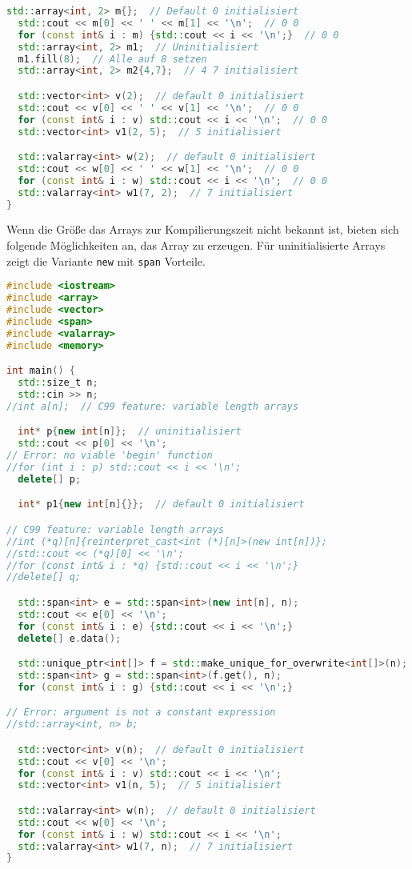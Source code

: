 \documentclass[10pt,twocolumn]{scrartcl}
\begin{document}
\begin{lstlisting}[language=C++]
  std::array<int, 2> m{};  // Default 0 initialisiert
  std::cout << m[0] << ' ' << m[1] << '\n';  // 0 0
  for (const int& i : m) {std::cout << i << '\n';}  // 0 0
  std::array<int, 2> m1;  // Uninitialisiert
  m1.fill(8);  // Alle auf 8 setzen
  std::array<int, 2> m2{4,7};  // 4 7 initialisiert

  std::vector<int> v(2);  // default 0 initialisiert
  std::cout << v[0] << ' ' << v[1] << '\n';  // 0 0
  for (const int& i : v) std::cout << i << '\n';  // 0 0
  std::vector<int> v1(2, 5);  // 5 initialisiert

  std::valarray<int> w(2);  // default 0 initialisiert
  std::cout << w[0] << ' ' << w[1] << '\n';  // 0 0
  for (const int& i : w) std::cout << i << '\n';  // 0 0
  std::valarray<int> w1(7, 2);  // 7 initialisiert
}
\end{lstlisting}

Wenn die Größe das Arrays zur Kompilierungszeit nicht bekannt ist, bieten sich
folgende Möglichkeiten an, das Array zu erzeugen. Für uninitialisierte Arrays
zeigt die Variante \lstinline|new| mit \lstinline|span| Vorteile.

\begin{lstlisting}[language=C++]
#include <iostream>
#include <array>
#include <vector>
#include <span>
#include <valarray>
#include <memory>

int main() {
  std::size_t n;
  std::cin >> n;
//int a[n];  // C99 feature: variable length arrays

  int* p{new int[n]};  // uninitialisiert
  std::cout << p[0] << '\n';
// Error: no viable 'begin' function
//for (int i : p) std::cout << i << '\n';
  delete[] p;

  int* p1{new int[n]{}};  // default 0 initialisiert

// C99 feature: variable length arrays
//int (*q)[n]{reinterpret_cast<int (*)[n]>(new int[n])};
//std::cout << (*q)[0] << '\n';
//for (const int& i : *q) {std::cout << i << '\n';}
//delete[] q;

  std::span<int> e = std::span<int>(new int[n], n);
  std::cout << e[0] << '\n';
  for (const int& i : e) {std::cout << i << '\n';}
  delete[] e.data();

  std::unique_ptr<int[]> f = std::make_unique_for_overwrite<int[]>(n);
  std::span<int> g = std::span<int>(f.get(), n);
  for (const int& i : g) {std::cout << i << '\n';}

// Error: argument is not a constant expression
//std::array<int, n> b;

  std::vector<int> v(n);  // default 0 initialisiert
  std::cout << v[0] << '\n';
  for (const int& i : v) std::cout << i << '\n';
  std::vector<int> v1(n, 5);  // 5 initialisiert

  std::valarray<int> w(n);  // default 0 initialisiert
  std::cout << w[0] << '\n';
  for (const int& i : w) std::cout << i << '\n';
  std::valarray<int> w1(7, n);  // 7 initialisiert
}
\end{lstlisting}
\end{document}
